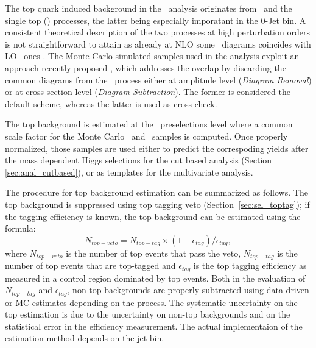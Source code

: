 The top quark induced background in the \WW\ analysis originates from
\ttbar\ and the single top (\tw) processes, the latter being especially imporatant 
in the 0-Jet bin.  A consistent theoretical description of the two
processes at high perturbation orders is not straightforward to attain
as already at NLO some \tw\ diagrams coincides with LO \ttbar\
ones \cite{singleTopInterference}.  The Monte Carlo simulated samples
used in the analysis exploit an approach recently
proposed \cite{singleTopRemoval}, which addresses the overlap by
discarding the common diagrams from the \tw\ process either at
amplitude level ({\it Diagram Removal}) or at cross section level
({\it Diagram Subtraction}).  The former is considered the default
scheme, whereas the latter is used as cross check.

The top background is estimated at the \WW\ preselections level where
a common scale factor for the Monte Carlo \ttbar\ and \tw\ samples is
computed.  Once properly normalized, those samples are used either to
predict the correspoding yields after the mass dependent Higgs
selections for the cut based analysis (Section \ref{sec:anal_cutbased}), 
or as templates for the multivariate analysis.

The procedure for top background estimation can be summarized as follows.
The top background is suppressed using top tagging veto (Section~\ref{sec:sel_toptag});
if the tagging efficiency is known, the top background can be estimated using the formula:
\begin{equation}
N_{top-veto} = N_{top-tag} \times (1-\epsilon_{tag})/\epsilon_{tag},
\end{equation}
where $N_{top-veto}$ is the number of top events that pass the veto, $N_{top-tag}$ is the 
number of top events that are top-tagged and $\epsilon_{tag}$ is the top tagging efficiency
as measured in a control region dominated by top events.
Both in the evaluation of $N_{top-tag}$ and $\epsilon_{tag}$, non-top backgrounds are properly 
subtracted using data-driven or MC estimates depending on the process.
The systematic uncertainty on the top estimation is due to the uncertainty on non-top 
backgrounds and on the statistical error in the efficiency measurement.
The actual implementaion of the estimation method depends on the jet bin.

